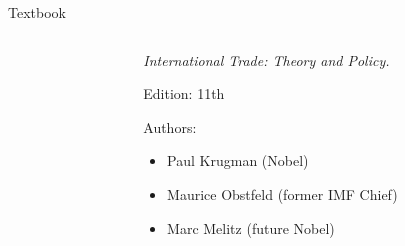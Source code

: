 \documentclass[notes,11pt, aspectratio=169, xcolor=table]{beamer}
\newenvironment{wideitemize}{\itemize\addtolength{\itemsep}{10pt}}{\enditemize}
\begin{document}
\begin{frame}{Textbook}

\begin{columns}[T] %
\begin{column}{.4\textwidth}
\end{column}%
\hfill%
\begin{column}{.58\textwidth}
  \begin{wideitemize}
  \item \textit{International Trade: Theory and Policy.}
    \item Edition: 11th
    \item Authors:
  \begin{itemize}
    \item Paul Krugman (Nobel)
    \item Maurice Obstfeld (former IMF Chief)
    \item Marc Melitz (future Nobel)
  \end{itemize}
  \end{wideitemize}
\end{column}%
\end{columns}
\end{frame}
\end{document}
